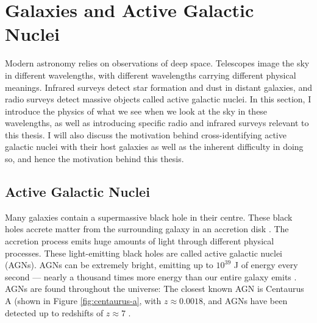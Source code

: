 \chapter{Galaxies and Active Galactic Nuclei}
\label{cha:astro}

    Modern astronomy relies on observations of deep space. Telescopes image the sky in different wavelengths, with different wavelengths carrying different physical meanings. Infrared surveys detect star formation and dust in distant galaxies, and radio surveys detect massive objects called active galactic nuclei. In this section, I introduce the physics of what we see when we look at the sky in these wavelengths, as well as introducing specific radio and infrared surveys relevant to this thesis. I will also discuss the motivation behind cross-identifying active galactic nuclei with their host galaxies as well as the inherent difficulty in doing so, and hence the motivation behind this thesis.







    \section{Active Galactic Nuclei}

        Many galaxies contain a supermassive black hole in their centre. These black holes accrete matter from the surrounding galaxy in an accretion disk . The accretion process emits huge amounts of light through different physical processes. These light-emitting black holes are called active galactic nuclei (AGNs). AGNs can be extremely bright, emitting up to $10^{39}$ J of energy every second --- nearly a thousand times more energy than our entire galaxy emits \citep{begelman84}. AGNs are found throughout the universe: The closest known AGN is Centaurus A (shown in Figure \ref{fig:centaurus-a}, with $z \approx 0.0018$, and AGNs have been detected up to redshifts of $z \approx 7$ .

